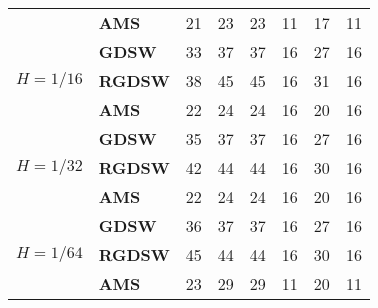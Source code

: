 \begin{table}[H]
\begin{tabular}{llrrrrrr}
\cline{2-8}
\bfseries  & \bfseries AMS & 21 & {\cellcolor[HTML]{405FE5}} \color[HTML]{F1F1F1} 23 & {\cellcolor[HTML]{405FE5}} \color[HTML]{F1F1F1} 23 & {\cellcolor[HTML]{E2E4FB}} \color[HTML]{000000} 11 & {\cellcolor[HTML]{91A1F0}} \color[HTML]{F1F1F1} 17 & 11 \\
\cline{1-8} \cline{2-8}
\multirow[c]{3}{*}{\bfseries $H=1/16$} & \bfseries GDSW & 33 & {\cellcolor[HTML]{405FE5}} \color[HTML]{F1F1F1} 37 & {\cellcolor[HTML]{405FE5}} \color[HTML]{F1F1F1} 37 & {\cellcolor[HTML]{E2E4FB}} \color[HTML]{000000} 16 & {\cellcolor[HTML]{91A1F0}} \color[HTML]{F1F1F1} 27 & 16 \\
\cline{2-8}
\bfseries  & \bfseries RGDSW & 38 & {\cellcolor[HTML]{405FE5}} \color[HTML]{F1F1F1} 45 & {\cellcolor[HTML]{405FE5}} \color[HTML]{F1F1F1} 45 & {\cellcolor[HTML]{E2E4FB}} \color[HTML]{000000} 16 & {\cellcolor[HTML]{405FE5}} \color[HTML]{F1F1F1} 31 & 16 \\
\cline{2-8}
\bfseries  & \bfseries AMS & 22 & {\cellcolor[HTML]{405FE5}} \color[HTML]{F1F1F1} 24 & {\cellcolor[HTML]{405FE5}} \color[HTML]{F1F1F1} 24 & {\cellcolor[HTML]{E2E4FB}} \color[HTML]{000000} 16 & {\cellcolor[HTML]{405FE5}} \color[HTML]{F1F1F1} 20 & 16 \\
\cline{1-8} \cline{2-8}
\multirow[c]{3}{*}{\bfseries $H=1/32$} & \bfseries GDSW & 35 & {\cellcolor[HTML]{405FE5}} \color[HTML]{F1F1F1} 37 & {\cellcolor[HTML]{405FE5}} \color[HTML]{F1F1F1} 37 & {\cellcolor[HTML]{E2E4FB}} \color[HTML]{000000} 16 & {\cellcolor[HTML]{91A1F0}} \color[HTML]{F1F1F1} 27 & 16 \\
\cline{2-8}
\bfseries  & \bfseries RGDSW & 42 & {\cellcolor[HTML]{405FE5}} \color[HTML]{F1F1F1} 44 & {\cellcolor[HTML]{405FE5}} \color[HTML]{F1F1F1} 44 & {\cellcolor[HTML]{E2E4FB}} \color[HTML]{000000} 16 & {\cellcolor[HTML]{91A1F0}} \color[HTML]{F1F1F1} 30 & 16 \\
\cline{2-8}
\bfseries  & \bfseries AMS & 22 & {\cellcolor[HTML]{405FE5}} \color[HTML]{F1F1F1} 24 & {\cellcolor[HTML]{405FE5}} \color[HTML]{F1F1F1} 24 & {\cellcolor[HTML]{E2E4FB}} \color[HTML]{000000} 16 & {\cellcolor[HTML]{405FE5}} \color[HTML]{F1F1F1} 20 & 16 \\
\cline{1-8} \cline{2-8}
\multirow[c]{3}{*}{\bfseries $H=1/64$} & \bfseries GDSW & 36 & {\cellcolor[HTML]{405FE5}} \color[HTML]{F1F1F1} 37 & {\cellcolor[HTML]{405FE5}} \color[HTML]{F1F1F1} 37 & {\cellcolor[HTML]{E2E4FB}} \color[HTML]{000000} 16 & {\cellcolor[HTML]{91A1F0}} \color[HTML]{F1F1F1} 27 & 16 \\
\cline{2-8}
\bfseries  & \bfseries RGDSW & 45 & {\cellcolor[HTML]{405FE5}} \color[HTML]{F1F1F1} 44 & {\cellcolor[HTML]{405FE5}} \color[HTML]{F1F1F1} 44 & {\cellcolor[HTML]{E2E4FB}} \color[HTML]{000000} 16 & {\cellcolor[HTML]{91A1F0}} \color[HTML]{F1F1F1} 30 & 16 \\
\cline{2-8}
\bfseries  & \bfseries AMS & 23 & {\cellcolor[HTML]{91A1F0}} \color[HTML]{F1F1F1} 29 & {\cellcolor[HTML]{91A1F0}} \color[HTML]{F1F1F1} 29 & {\cellcolor[HTML]{E2E4FB}} \color[HTML]{000000} 11 & {\cellcolor[HTML]{405FE5}} \color[HTML]{F1F1F1} 20 & 11 \\
\cline{1-8} \cline{2-8}
\bottomrule
\end{tabular}
\end{table}
